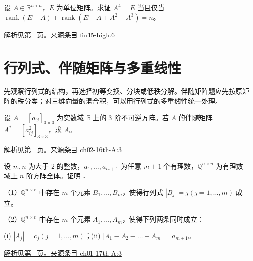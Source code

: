 \documentclass[12pt,fontset=fandol]{ctexart}
\begin{document}
\begin{example}\label{ex:fin15-high:6}

设 $A \in \mathbb{R}^{n\times n}$，$E$ 为单位矩阵。求证 $A^{4} = E$ 当且仅当 $\operatorname{rank}(E - A) + \operatorname{rank}\left(E + A + A^{2} + A^{3}\right) = n$。

\par\hyperref[ans:fin15-high:6]{解析见第~\pageref{ans:fin15-high:6} 页。}\quad\href{https://github.com/lzxcr/cmc-mathematics/blob/64916fa1fdbc3e444a652eca204d5669058ee321/src/problems/finals/15/06.md}{来源条目 fin15-high:6}

\end{example}

\section{行列式、伴随矩阵与多重线性}

\label{sec:questions-2}

先观察行列式的结构，再选择初等变换、分块或低秩分解。伴随矩阵题应先按原矩阵的秩分类；对三维向量的混合积，可以用行列式的多重线性统一处理。

\begin{example}\label{ex:ch02-16th-A:3}

设 $A=[a_{ij}]_{3 \times 3}$ 为实数域 $\mathbb{R}$ 上的 3 阶不可逆方阵。若 $A$ 的伴随矩阵 $A^{*}=[a_{ij}^{2}]_{3 \times 3}$，求 $A$。

\par\hyperref[ans:ch02-16th-A:3]{解析见第~\pageref{ans:ch02-16th-A:3} 页。}\quad\href{https://github.com/lzxcr/cmc-mathematics/blob/64916fa1fdbc3e444a652eca204d5669058ee321/src/problems/preliminary/16/03.md}{来源条目 ch02-16th-A:3}

\end{example}

\begin{example}\label{ex:ch01-17th-A:3}

设 $m, n$ 为大于 2 的整数，$a_1, \dots, a_{m+1}$ 为任意 $m+1$ 个有理数，$\mathbb Q^{n\times n}$ 为有理数域上 $n$ 阶方阵全体。证明：

（1）$\mathbb Q^{n\times n}$ 中存在 $m$ 个元素 $B_1, \dots, B_m$，使得行列式 $\left|B_j\right| = j(j=1, \dots, m)$ 成立。

（2）$\mathbb Q^{n\times n}$ 中存在 $m$ 个元素 $A_1, \dots, A_m$，使得下列两条同时成立：

(i) $\left|A_j\right| = a_j(j=1, \dots, m)$；(ii) $\left|A_1 - A_2 - \dots - A_m\right| = a_{m+1}$。

\par\hyperref[ans:ch01-17th-A:3]{解析见第~\pageref{ans:ch01-17th-A:3} 页。}\quad\href{https://github.com/lzxcr/cmc-mathematics/blob/64916fa1fdbc3e444a652eca204d5669058ee321/src/problems/preliminary/17/03.md}{来源条目 ch01-17th-A:3}

\end{example}
\end{document}
